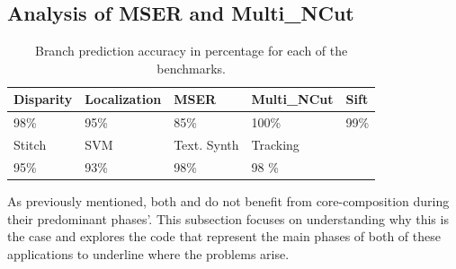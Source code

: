 \subsection{Analysis of MSER and Multi\_NCut}

\begin{table}[t]
  \small
  \centering
 \begin{tabular} { | l | l | l | l | l | }
 \hline
   \cellcolor[gray]{0.7}Disparity & \cellcolor[gray]{0.7} Localization& \cellcolor[gray]{0.7} MSER& \cellcolor[gray]{0.7} Multi\_NCut& \cellcolor[gray]{0.7} Sift\\ \hline
	98\%  & 95\% & 85\%  & 100\%& 99\%\\ \hline
	 \cellcolor[gray]{0.7} Stitch & \cellcolor[gray]{0.7} SVM & \cellcolor[gray]{0.7} Text. Synth & \cellcolor[gray]{0.7} Tracking&\\ \hline
	  95\%& 93\%& 98\%& 98 \%&\\ \hline
	\end{tabular}
  \caption{Branch prediction accuracy in percentage for each of the benchmarks.}\label{tab:sd-vbsbpred}
  \vspace{1em}
\end{table}

As previously mentioned, both  and  do not benefit from core-composition during their predominant phases'.
This subsection focuses on understanding why this is the case and explores the code that represent the main phases of both of these applications to underline where the problems arise.


